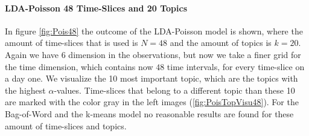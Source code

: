 \documentclass[11pt,a4paper]{article}
\begin{document}
\paragraph{LDA-Poisson 48 Time-Slices and 20 Topics}
In figure \ref{fig:Pois48} the outcome of the LDA-Poisson model is shown, where the amount of time-slices that is used is $N=48$ and the amount of topics is $k=20$. Again we have 6 dimension in the observations, but now we take a finer grid for the time dimension, which contains now $48$ time intervals, for every time-slice on a day one. We visualize the 10 most important topic, which are the topics with the highest $\alpha$-values. Time-slices that belong to a different topic than these 10 are marked with the color gray in the left images (\ref{fig:PoisTopVisu48}).
For the Bag-of-Word and the k-means model no reasonable results are found for these amount of time-slices and topics.	
\end{document}
